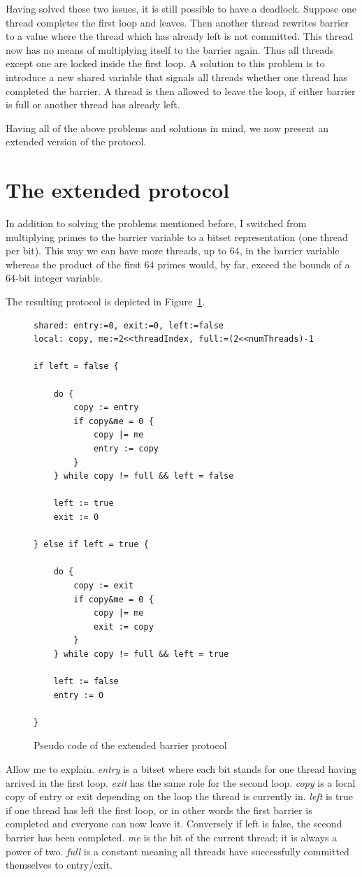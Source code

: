 \documentclass[a4paper, 10pt]{article}
\begin{document}
Having solved these two issues, it is still possible to have a deadlock. Suppose one thread completes the first loop and leaves. Then another thread rewrites barrier to a value where the thread which has already left is not committed. This thread now has no means of multiplying itself to the barrier again. Thus all threads except one are locked inside the first loop. A solution to this problem is to introduce a new shared variable that signals all threads whether one thread has completed the barrier. A thread is then allowed to leave the loop, if either barrier is full or another thread has already left.

Having all of the above problems and solutions in mind, we now present an extended version of the protocol.

\section{The extended protocol}
In addition to solving the problems mentioned before, I switched from multiplying primes to the barrier variable to a bitset representation (one thread per bit). This way we can have more threads, up to 64, in the barrier variable whereas the product of the first 64 primes would, by far, exceed the bounds of a 64-bit integer variable.

The resulting protocol is depicted in Figure~\ref{fig:barrier-source-code}.

\begin{figure}[htb]
	\centering
	\begin{lstlisting}
shared: entry:=0, exit:=0, left:=false
local: copy, me:=2<<threadIndex, full:=(2<<numThreads)-1

if left = false {

	do {
		copy := entry
		if copy&me = 0 {
			copy |= me
			entry := copy
		}
	} while copy != full && left = false

	left := true
	exit := 0

} else if left = true {

	do {
		copy := exit
		if copy&me = 0 {
			copy |= me
			exit := copy
		}
	} while copy != full && left = true

	left := false
	entry := 0

}
	\end{lstlisting}
	\caption{Pseudo code of the extended barrier protocol}
	\label{fig:barrier-source-code}
\end{figure}

Allow me to explain. \emph{entry} is a bitset where each bit stands for one thread having arrived in the first loop. \emph{exit} has the same role for the second loop. \emph{copy} is a local copy of entry or exit depending on the loop the thread is currently in. \emph{left} is true if one thread has left the first loop, or in other words the first barrier is completed and everyone can now leave it. Conversely if left is false, the second barrier has been completed. \emph{me} is the bit of the current thread; it is always a power of two. \emph{full} is a constant meaning all threads have successfully committed themselves to entry/exit.
\end{document}
